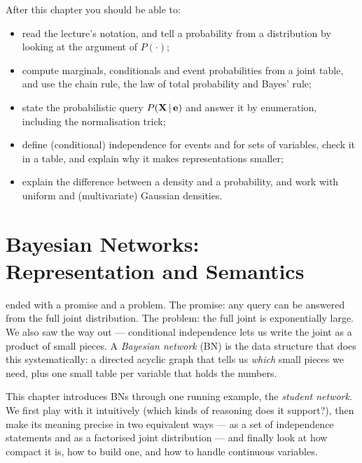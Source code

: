 \documentclass[11pt, oneside]{book}
\newcommand{\Prob}{\mathbb{P}}           %
\newcommand{\given}{\,\vert\,}           %
\newcommand{\bX}{\mathbf{X}}  \newcommand{\bY}{\mathbf{Y}}
\begin{document}
After this chapter you should be able to:
\begin{itemize}
  \item read the lecture's notation, and tell a probability from a
    distribution by looking at the argument of $P(\cdot)$;
  \item compute marginals, conditionals and event probabilities from a joint
    table, and use the chain rule, the law of total probability and Bayes'
    rule;
  \item state the probabilistic query $P(\bX \given \be)$ and answer it by
    enumeration, including the normalisation trick;
  \item define (conditional) independence for events and for sets of
    variables, check it in a table, and explain why it makes representations
    smaller;
  \item explain the difference between a density and a probability, and work
    with uniform and (multivariate) Gaussian densities.
\end{itemize}


\chapter[Bayesian Networks: Representation and Semantics]{Bayesian Networks:\\ Representation and Semantics}
\label{ch:bn}

 ended with a promise and a problem. The promise: any query can
be answered from the full joint distribution. The problem: the full joint is
exponentially large. We also saw the way out --- conditional independence lets
us write the joint as a product of small pieces. A \emph{Bayesian network}
(BN) is the data structure that does this systematically: a directed acyclic
graph that tells us \emph{which} small pieces we need, plus one small table
per variable that holds the numbers.

This chapter introduces BNs through one running example, the \emph{student
network}. We first play with it intuitively (which kinds of reasoning does it
support?), then make its meaning precise in two equivalent ways --- as a set of
independence statements and as a factorised joint distribution --- and finally
look at how compact it is, how to build one, and how to handle continuous
variables.
\end{document}
